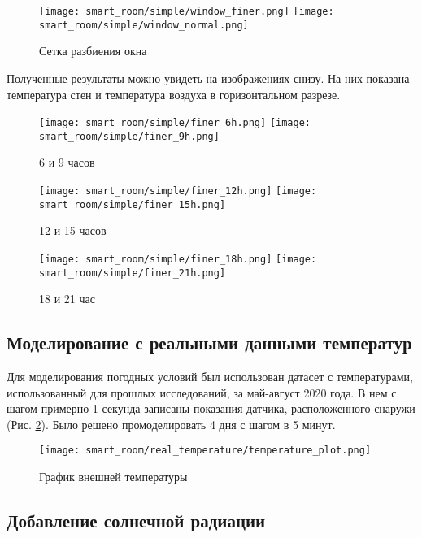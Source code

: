 \begin{figure}[H]
\texttt{[image: smart\_room/simple/window\_finer.png]}\hfill
\texttt{[image: smart\_room/simple/window\_normal.png]}
\caption{Сетка разбиения окна}
\label{window}
\end{figure}


Полученные результаты можно увидеть на изображениях снизу. На них показана температура стен и температура воздуха в горизонтальном разрезе.

\begin{figure}[H]
\texttt{[image: smart\_room/simple/finer\_6h.png]}\hfill
\texttt{[image: smart\_room/simple/finer\_9h.png]}
\caption{6 и 9 часов}
\end{figure}

\begin{figure}[H]
\texttt{[image: smart\_room/simple/finer\_12h.png]}\hfill
\texttt{[image: smart\_room/simple/finer\_15h.png]}
\caption{12 и 15 часов}
\end{figure}

\begin{figure}[H]
\texttt{[image: smart\_room/simple/finer\_18h.png]}\hfill
\texttt{[image: smart\_room/simple/finer\_21h.png]}
\caption{18 и 21 час}
\end{figure}
\newpage


\subsection{Моделирование с реальными данными температур}

Для моделирования погодных условий был использован датасет с температурами, использованный для прошлых исследований, за май-август 2020 года. В нем с шагом примерно 1 секунда записаны показания датчика, расположенного снаружи (Рис. \ref{real-temperature-plot}). Было решено промоделировать 4 дня с шагом в 5 минут. 

\begin{figure}[H]
\texttt{[image: smart\_room/real\_temperature/temperature\_plot.png]}
\caption{График внешней температуры}
\label{real-temperature-plot}
\end{figure}

\newpage


\subsection{Добавление солнечной радиации}

